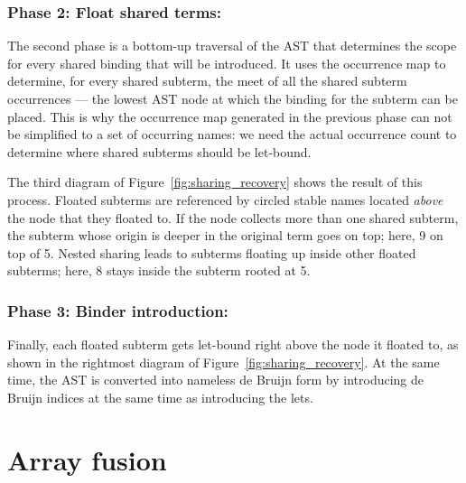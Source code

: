 \subsubsection*{Phase 2: Float shared terms:}

The second phase is a bottom-up traversal of the AST that determines the scope
for every shared binding that will be introduced. It uses the occurrence map to
determine, for every shared subterm, the meet of all the shared subterm
occurrences --- the lowest AST node at which the binding for the subterm can be
placed. This is why the occurrence map generated in the previous phase can not
be simplified to a set of occurring names: we need the actual occurrence count
to determine where shared subterms should be let-bound.

The third diagram of Figure~\ref{fig:sharing_recovery} shows the result of this
process. Floated subterms are referenced by circled stable names located
\emph{above} the node that they floated to. If the node collects more than one
shared subterm, the subterm whose origin is deeper in the original term goes on
top; here, 9 on top of 5. Nested sharing leads to subterms floating up inside
other floated subterms; here, 8 stays inside the subterm rooted at 5.


\subsubsection*{Phase 3: Binder introduction:}

Finally, each floated subterm gets let-bound right above the node it floated to,
as shown in the rightmost diagram of Figure~\ref{fig:sharing_recovery}. At the
same time, the AST is converted into nameless de Bruijn form by introducing de
Bruijn indices at the same time as introducing the lets.


\section{Array fusion}
\label{sec:array_fusion}

